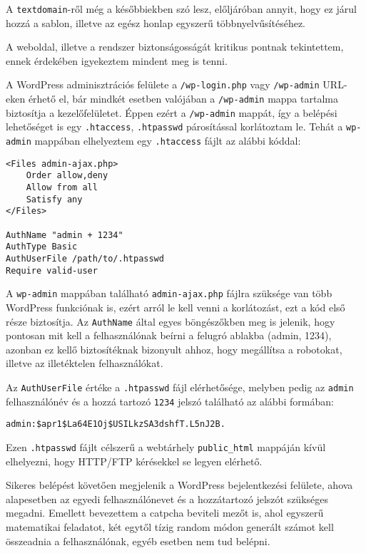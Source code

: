 A \texttt{textdomain}-ről még a későbbiekben szó lesz, előljáróban annyit, hogy ez járul hozzá a sablon, illetve az egész honlap egyszerű többnyelvűsítéséhez.

\newpage


A weboldal, illetve a rendszer biztonságosságát kritikus pontnak tekintettem, ennek érdekében igyekeztem mindent meg is tenni.

A WordPress adminisztrációs felülete a \texttt{/wp-login.php} vagy \texttt{/wp-admin} URL-eken érhető el, bár mindkét esetben valójában a \texttt{/wp-admin} mappa tartalma biztosítja a kezelőfelületet. Éppen ezért a \texttt{/wp-admin} mappát, így a belépési lehetőséget is egy \texttt{.htaccess}, \texttt{.htpasswd} párosítással korlátoztam le. Tehát a \texttt{wp-admin} mappában elhelyeztem egy \texttt{.htaccess} fájlt az alábbi kóddal:

\begin{lstlisting}
<Files admin-ajax.php>
	Order allow,deny
	Allow from all
	Satisfy any
</Files>

AuthName "admin + 1234"
AuthType Basic
AuthUserFile /path/to/.htpasswd
Require valid-user
\end{lstlisting}

A \texttt{wp-admin} mappában található \verb|admin-ajax.php| fájlra szüksége van több WordPress funkciónak is, ezért arról le kell venni a korlátozást, ezt  a kód első része biztosítja. Az \texttt{AuthName} által egyes böngészőkben meg is jelenik, hogy pontosan mit kell a felhasználónak beírni a felugró ablakba (admin, 1234), azonban ez kellő biztosítéknak bizonyult ahhoz, hogy megállítsa a robotokat, illetve az illetéktelen felhasználókat.

Az \texttt{AuthUserFile} értéke a \texttt{.htpasswd} fájl elérhetősége, melyben pedig az \verb|admin| felhasználónév és a hozzá tartozó \verb|1234| jelszó található az alábbi formában:

\begin{lstlisting}
admin:$apr1$La64E1Oj$USILkzSA3dshfT.L5nJ2B.
\end{lstlisting}

Ezen \texttt{.htpasswd} fájlt célszerű a webtárhely \texttt{public\_html} mappáján kívül elhelyezni, hogy HTTP/FTP kérésekkel se legyen elérhető.

Sikeres belépést követően megjelenik a WordPress bejelentkezési felülete, ahova alapesetben az egyedi felhasználónevet és a hozzátartozó jelszót szükséges megadni. Emellett bevezettem a catpcha beviteli mezőt is, ahol egyszerű matematikai feladatot, két egytől tízig random módon generált számot kell összeadnia a felhasználónak, egyéb esetben nem tud belépni.

